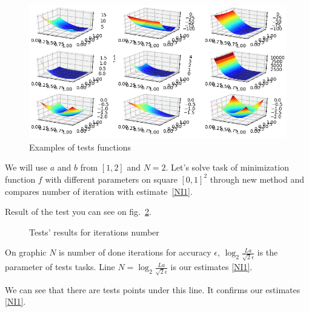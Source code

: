\documentclass[12pt]{article}
\begin{document}
\begin{figure}[H]
\centering
\includegraphics[scale=0.6]{./Tests/Examples.png}
\caption{Examples of tests functions}
\label{fig:examples}
\end{figure}

We will use $a$ and $b$ from $[1, 2]$ and $N = 2$. Let's solve task of minimization function $f$ with different parameters on square $[0,1]^2$ through new method and compares number of iteration with estimate~\eqref{NI1}.

Result of the test you can see on fig.~\ref{fig:image}.

\begin{figure}[h!]
\caption{Tests' results for iterations number}
\label{fig:image}
\end{figure}

On graphic $N$ is number of done iterations for accuracy $\epsilon$, $\log_2\frac{La}{\sqrt{2}\epsilon}$ is the parameter of tests tasks. Line $N = \log_2\frac{La}{\sqrt{2}\epsilon}$ is our estimates \eqref{NI1}.

We can see that there are tests points under this line. It confirms our estimates \eqref{NI1}.
\end{document}
